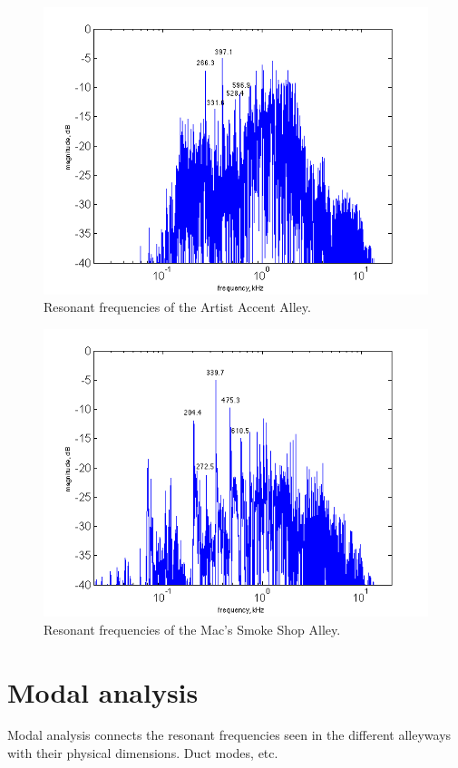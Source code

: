\documentclass{aes137}
\begin{document}
\begin{figure}[h!] \centering \includegraphics[width=\linewidth]{images/artists_labeled_IR.png} \caption{Resonant frequencies of the Artist Accent Alley.} \end{figure}

\begin{figure}[h!] \centering \includegraphics[width=\linewidth]{images/macs_labeled_IR.png} \caption{Resonant frequencies of the Mac's Smoke Shop Alley.} \end{figure}

\section{Modal analysis}
Modal analysis connects the resonant frequencies seen in the different alleyways with their physical dimensions. Duct modes, etc.
\end{document}
